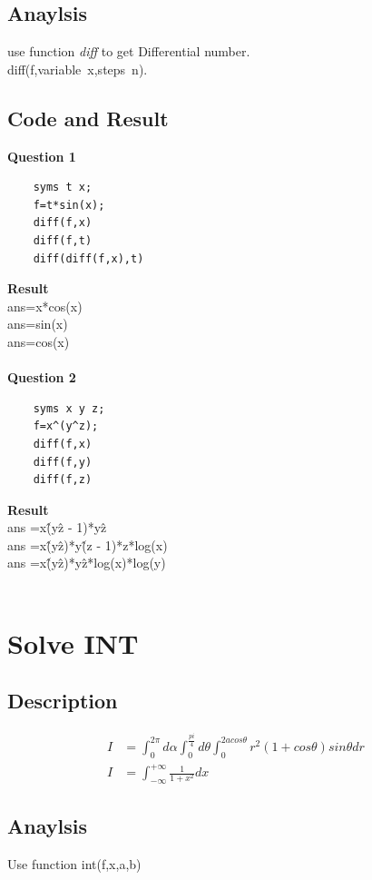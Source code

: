 \documentclass[UTF8,a4paper]{article}
\begin{document}
\subsection{Anaylsis}
\noindent use function \textit{diff} to get Differential number.\\
diff(f,variable~x,steps~n).
\subsection{Code and Result}
\textbf{Question 1}\\
\begin{lstlisting}
    syms t x;
    f=t*sin(x);
    diff(f,x)
    diff(f,t)
    diff(diff(f,x),t)       
\end{lstlisting}
\textbf{Result}\\
ans=x*cos(x)\\
ans=sin(x)\\
ans=cos(x)\\\\
\textbf{Question 2}\\
\begin{lstlisting}
    syms x y z;
    f=x^(y^z);
    diff(f,x)
    diff(f,y)
    diff(f,z)\end{lstlisting}
\textbf{Result}\\
ans =x\^(y\^z - 1)*y\^z\\
ans =x\^(y\^ z)*y\^ (z - 1)*z*log(x)\\
ans =x\^(y\^ z)*y\^ z*log(x)*log(y)\\\\
\section{Solve INT}
\subsection{Description}
$$
\begin{aligned}
    I&=\int_{0}^{2\pi}d\alpha \int_{0}^{\frac{pi}{4}} d\theta \int_{0}^{2acos\theta} r^2(1+cos\theta)sin\theta dr\\
    I&=\int_{-\infty}^{+\infty} \frac{1}{1+x^2} dx
\end{aligned}
$$
\subsection{Anaylsis}
\noindent Use function int(f,x,a,b)
\end{document}
